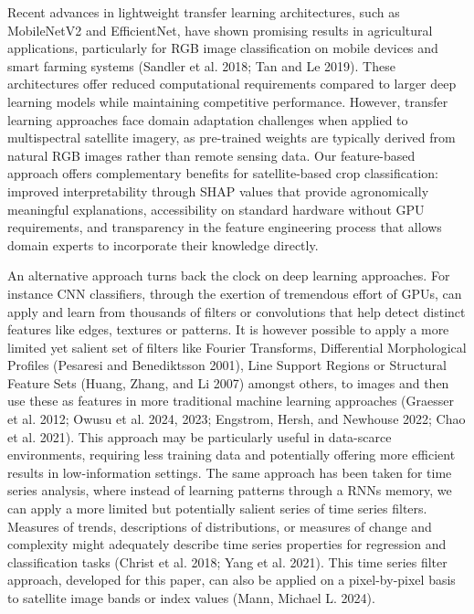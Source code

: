 \documentclass[
  journal,
  twocolumn]{IEEEtran}
\begin{document}
Recent advances in lightweight transfer learning architectures, such as
MobileNetV2 and EfficientNet, have shown promising results in
agricultural applications, particularly for RGB image classification on
mobile devices and smart farming systems (Sandler et al. 2018; Tan and
Le 2019). These architectures offer reduced computational requirements
compared to larger deep learning models while maintaining competitive
performance. However, transfer learning approaches face domain
adaptation challenges when applied to multispectral satellite imagery,
as pre-trained weights are typically derived from natural RGB images
rather than remote sensing data. Our feature-based approach offers
complementary benefits for satellite-based crop classification: improved
interpretability through SHAP values that provide agronomically
meaningful explanations, accessibility on standard hardware without GPU
requirements, and transparency in the feature engineering process that
allows domain experts to incorporate their knowledge directly.

An alternative approach turns back the clock on deep learning
approaches. For instance CNN classifiers, through the exertion of
tremendous effort of GPUs, can apply and learn from thousands of filters
or convolutions that help detect distinct features like edges, textures
or patterns. It is however possible to apply a more limited yet salient
set of filters like Fourier Transforms, Differential Morphological
Profiles (Pesaresi and Benediktsson 2001), Line Support Regions or
Structural Feature Sets (Huang, Zhang, and Li 2007) amongst others, to
images and then use these as features in more traditional machine
learning approaches (Graesser et al. 2012; Owusu et al. 2024, 2023;
Engstrom, Hersh, and Newhouse 2022; Chao et al. 2021). This approach may
be particularly useful in data-scarce environments, requiring less
training data and potentially offering more efficient results in
low-information settings. The same approach has been taken for time
series analysis, where instead of learning patterns through a RNNs
memory, we can apply a more limited but potentially salient series of
time series filters. Measures of trends, descriptions of distributions,
or measures of change and complexity might adequately describe time
series properties for regression and classification tasks (Christ et al.
2018; Yang et al. 2021). This time series filter approach, developed for
this paper, can also be applied on a pixel-by-pixel basis to satellite
image bands or index values (Mann, Michael L. 2024).
\end{document}

